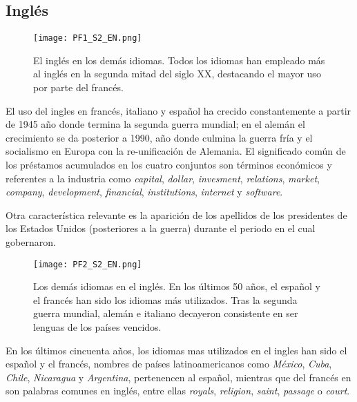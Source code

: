 \subsection{Inglés} %


\begin{figure}%
	\centering
	\texttt{[image: PF1\_S2\_EN.png]}
	\label{fig.ST_a_EN}
	\caption{El inglés en los demás idiomas. Todos los idiomas han empleado más al inglés en la segunda mitad del siglo XX, destacando el mayor uso por parte del francés.}
\end{figure} 

El uso del ingles en francés, italiano y español ha crecido constantemente a partir de 1945 año donde termina la segunda guerra mundial; en el alemán el crecimiento se da posterior a 1990, año donde culmina la guerra fría  y el socialismo en Europa con la re-unificación de Alemania. El significado común de los préstamos acumulados  en los cuatro conjuntos  son términos económicos y referentes a la industria como  \textit{capital}, \textit{dollar}, \textit{invesment}, \textit{relations}, \textit{market}, \textit{company}, \textit{development}, \textit{financial},  \textit{institutions}, \textit{internet} y \textit{software}. 

Otra característica relevante es la aparición  de los apellidos de los presidentes de los Estados Unidos (posteriores a la guerra) durante el periodo en el cual gobernaron. 


\begin{figure}%
	\centering
	\texttt{[image: PF2\_S2\_EN.png]}
	\label{fig.ST_b_EN}
	\caption{Los demás idiomas en el inglés. En los últimos 50 años, el español y el francés han sido los idiomas más utilizados. Tras la segunda guerra mundial, alemán e italiano decayeron consistente en ser lenguas de los países vencidos.}
\end{figure} 


En los últimos cincuenta años, los idiomas mas utilizados  en el ingles han sido el español y el francés,  nombres de países latinoamericanos como \textit{México}, \textit{Cuba}, \textit{Chile}, \textit{Nicaragua} y \textit{Argentina}, pertenencen  al  español, mientras que del  francés en son palabras comunes en  inglés, entre ellas \textit{royals}, \textit{religion}, \textit{saint}, \textit{passage} o \textit{court}.

